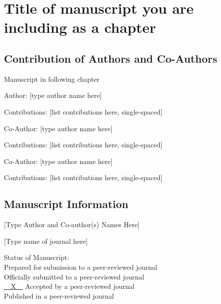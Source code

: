 
\chapter{Title of manuscript you are\\ including as a chapter}\label{CH:manuscript}

\section{Contribution of Authors and Co-Authors}

Manuscript in following chapter

Author: [type author name here]

Contributions: [list contributions here, single-spaced]

Co-Author: [type author name here]

Contributions: [list contributions here, single-spaced]

Co-Author: [type author name here]

Contributions: [list contributions here, single-spaced]


\newpage

\section{Manuscript Information}

[Type Author and Co-author(s) Names Here]

[Type name of journal here]

\begin{singlespace}
  Status of Manuscript: \\\indent %
  \underline{\phantom{~~X~~}} Prepared for submission to a peer-reviewed journal\\\indent
  \underline{\phantom{~~X~~}} Officially submitted to a peer-reviewed journal\\\indent
  \underline{~~X~~} Accepted by a peer-reviewed journal\\\indent
  \underline{\phantom{~~X~~}} Published in a peer-reviewed journal
\end{singlespace}

